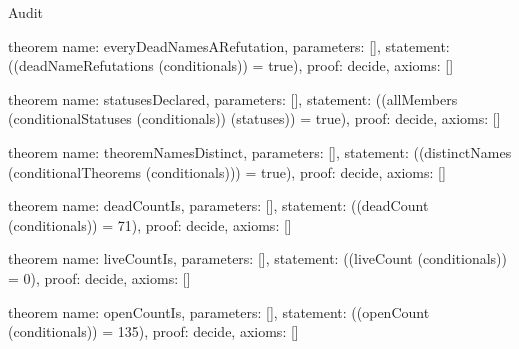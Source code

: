 \begin{lexlean}{Audit}
\begin{semanticmodule}
theorem{
  name: everyDeadNamesARefutation,
  parameters: [],
  statement: ((deadNameRefutations (conditionals)) = true),
  proof: decide{},
  axioms: []
}

theorem{
  name: statusesDeclared,
  parameters: [],
  statement: ((allMembers (conditionalStatuses (conditionals)) (statuses)) = true),
  proof: decide{},
  axioms: []
}

theorem{
  name: theoremNamesDistinct,
  parameters: [],
  statement: ((distinctNames (conditionalTheorems (conditionals))) = true),
  proof: decide{},
  axioms: []
}

theorem{
  name: deadCountIs,
  parameters: [],
  statement: ((deadCount (conditionals)) = 71),
  proof: decide{},
  axioms: []
}

theorem{
  name: liveCountIs,
  parameters: [],
  statement: ((liveCount (conditionals)) = 0),
  proof: decide{},
  axioms: []
}

theorem{
  name: openCountIs,
  parameters: [],
  statement: ((openCount (conditionals)) = 135),
  proof: decide{},
  axioms: []
}
\end{semanticmodule}
\end{lexlean}
